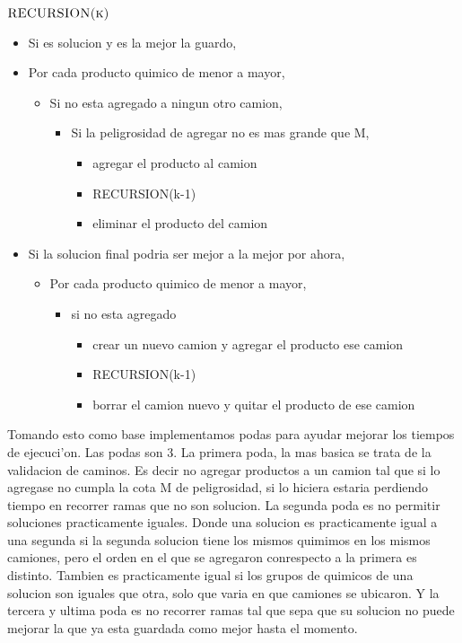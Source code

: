 $\textnormal{\scshape RECURSION(k)}$
\begin{itemize}
\item Si es solucion y es la mejor la guardo,					
\item Por cada producto quimico de menor a mayor, 					
	\begin{itemize}
	\item Si no esta agregado a ningun otro camion,							
		\begin{itemize}
		\item Si la peligrosidad de agregar no es mas grande que M,	
			\begin{itemize}
			\item agregar el producto al camion						
			\item RECURSION(k-1)										
			\item eliminar el producto del camion						
			\end{itemize}													
		\end{itemize}												
	\end{itemize}															
\item Si la solucion final podria ser mejor a la mejor por ahora,				
	\begin{itemize}
	\item Por cada producto quimico de menor a mayor,							
		\begin{itemize}
		\item si no esta agregado													
			\begin{itemize}
			\item crear un nuevo camion y agregar el producto ese camion			
			\item RECURSION(k-1)												
			\item borrar el camion nuevo y quitar el producto de ese camion
			\end{itemize}		
		\end{itemize}						
	\end{itemize}			
\end{itemize}



Tomando esto como base implementamos podas para ayudar mejorar los tiempos de ejecuci'on. Las podas son 3. 
La primera poda, la mas basica se trata de la validacion de caminos. Es decir no agregar productos a un camion tal que si lo agregase no cumpla la cota M de peligrosidad, si lo hiciera estaria perdiendo tiempo en recorrer ramas que no son solucion.
La segunda poda es no permitir soluciones practicamente iguales. Donde una solucion es practicamente igual a una segunda si la segunda solucion tiene los mismos quimimos en los mismos camiones, pero el orden en el que se agregaron conrespecto a la primera es distinto. Tambien es practicamente igual si los grupos de quimicos de una solucion son iguales que otra, solo que varia en que camiones se ubicaron.
Y la tercera y ultima poda es no recorrer ramas tal que sepa que su solucion no puede mejorar la que ya esta guardada como mejor hasta el momento.

